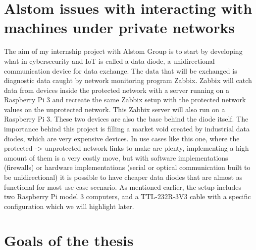 \documentclass[a4paper, 12pt]{book}
\begin{document}
\section{Alstom issues with interacting with machines under private networks}
The aim of my internship project with Alstom Group is to start by developing what in cybersecurity and IoT is called a data diode, a unidirectional communication device for data exchange.
The data that will be exchanged is diagnostic data caught by network monitoring program Zabbix. Zabbix will catch data from devices inside the protected network with a server running on a Raspberry Pi 3 and recreate the same Zabbix setup with the protected network values on the unprotected network. This Zabbix server will also run on a Raspberry Pi 3. These two devices are also the base behind the diode itself.
The importance behind this project is filling a market void created by industrial data diodes, which are very expensive devices. In use cases like this one, where the protected -> unprotected network links to make are plenty, implementing a high amount of them is a very costly move, but with software implementations (firewalls) or hardware implementations (serial or optical communication built to be unidirectional) it is possible to have cheaper data diodes that are almost as functional for most use case scenario. As mentioned earlier, the setup includes two Raspberry Pi model 3 computers, and a TTL-232R-3V3 cable with a specific configuration which we will highlight later.
\section{Goals of the thesis}
\end{document}
